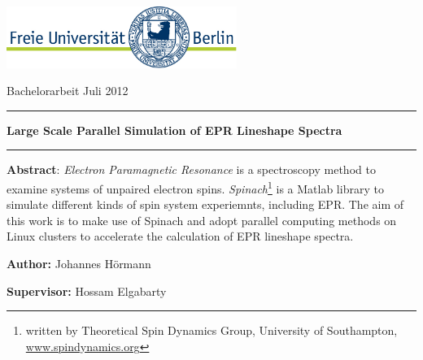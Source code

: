 \documentclass[11.5pt,a4paper]{article}
\begin{document}
\setlength{\parindent}{0pt} %


\thispagestyle{empty}

\includegraphics[height=2cm]{FULogo.jpg}
\hfill %
\parbox[b]{0.5\textwidth}{{\large Bachelorarbeit Juli 2012\\}}

\vspace{2cm}

\begin{center}

\rule[11pt]{15cm}{0.5pt}

{ \textbf {\Large Large Scale Parallel Simulation of EPR Lineshape Spectra}}

\rule{15cm}{0.5pt}

\vspace{1cm}

\parbox{15cm}{\small
\textbf{Abstract}: \emph{Electron Paramagnetic Resonance} is a spectroscopy method to examine systems of unpaired electron spins. \emph{Spinach}\footnote{written by Theoretical Spin Dynamics Group, University of Southampton, \url{www.spindynamics.org}} is a Matlab library to simulate different kinds of spin system experiemnts, including EPR. The aim of this work is to make use of Spinach and adopt parallel computing methods on Linux clusters to accelerate the calculation of EPR lineshape spectra.  }

\vspace{0.5cm}

\end{center}

\vspace{1cm}

\large{

{\bf Author:}  Johannes H\"ormann}
\vspace{0.3cm}

{\bf Supervisor:} Hossam Elgabarty

\vspace{1cm}

\end{document}

